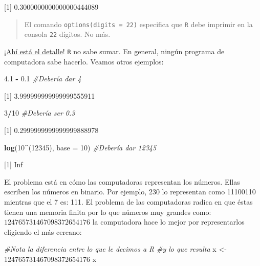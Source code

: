 \documentclass[
]{book}
\newenvironment{Shaded}{\begin{snugshade}}{\end{snugshade}}
\newcommand{\CommentTok}[1]{\textcolor[rgb]{0.56,0.35,0.01}{\textit{#1}}}
\newcommand{\DataTypeTok}[1]{\textcolor[rgb]{0.13,0.29,0.53}{#1}}
\newcommand{\DecValTok}[1]{\textcolor[rgb]{0.00,0.00,0.81}{#1}}
\newcommand{\FloatTok}[1]{\textcolor[rgb]{0.00,0.00,0.81}{#1}}
\newcommand{\KeywordTok}[1]{\textcolor[rgb]{0.13,0.29,0.53}{\textbf{#1}}}
\newcommand{\NormalTok}[1]{#1}
\newcommand{\OperatorTok}[1]{\textcolor[rgb]{0.81,0.36,0.00}{\textbf{#1}}}
\newcommand{\StringTok}[1]{\textcolor[rgb]{0.31,0.60,0.02}{#1}}
\begin{document}
{[}1{]} 0.3000000000000000444089

\begin{quote}
El comando \texttt{options(digits\ =\ 22)} especifica que \texttt{R} debe imprimir en la consola \texttt{22} dígitos. No más.
\end{quote}

¡\href{https://www.youtube.com/watch?v=1jaCpeXg-gg}{Ahí está el detalle}! \texttt{R} no sabe sumar. En general, ningún programa de computadora sabe hacerlo. Veamos otros ejemplos:

\begin{Shaded}
\begin{Highlighting}[]
\FloatTok{4.1} \OperatorTok{-}\StringTok{ }\FloatTok{0.1} \CommentTok{#Debería dar 4}
\end{Highlighting}
\end{Shaded}

{[}1{]} 3.999999999999999555911

\begin{Shaded}
\begin{Highlighting}[]
\DecValTok{3}\OperatorTok{/}\DecValTok{10}      \CommentTok{#Debería ser 0.3}
\end{Highlighting}
\end{Shaded}

{[}1{]} 0.2999999999999999888978

\begin{Shaded}
\begin{Highlighting}[]
\KeywordTok{log}\NormalTok{(}\DecValTok{10}\OperatorTok{^}\NormalTok{(}\DecValTok{12345}\NormalTok{), }\DataTypeTok{base =} \DecValTok{10}\NormalTok{) }\CommentTok{#Debería dar 12345}
\end{Highlighting}
\end{Shaded}

{[}1{]} Inf

El problema está en cómo las computadoras representan los números. Ellas escriben los números en binario. Por ejemplo, 230 lo representan como 11100110 mientras que el 7 es: 111. El problema de las computadoras radica en que éstas tienen una memoria finita por lo que números muy grandes como: \(124765731467098372654176\) la computadora hace lo mejor por representarlos eligiendo el más cercano:

\begin{Shaded}
\begin{Highlighting}[]
\CommentTok{#Nota la diferencia entre lo que le decimos a R}
\CommentTok{#y lo que resulta}
\NormalTok{x <-}\StringTok{ }\DecValTok{124765731467098372654176}
\NormalTok{x}
\end{Highlighting}
\end{Shaded}
\end{document}
